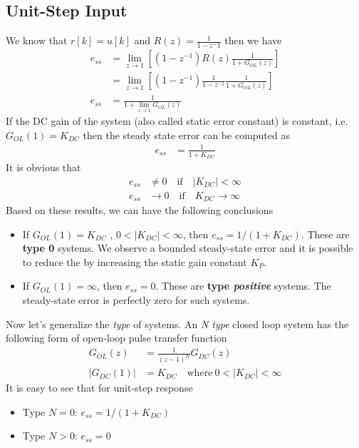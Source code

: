 \documentclass[twoside]{article}
\begin{document}
\subsection*{Unit-Step Input}

We know that $r[k] = u[k]$ and $R(z) = \frac{1}{1 - z^-1}$ then 
we have
%
%
\begin{align*}
e_{ss} &= \lim_{z \to 1} \left[ \left(1 - z^{-1} \right) R(z) \frac{1}{1
         + G_{OL} (z) } \right]
\\
&= \lim_{z \to 1} \left[ \left(1 - z^{-1} \right) \frac{1}{1-z^{-1}} \frac{1}{1
         + G_{OL} (z) } \right]
\\
e_{ss} &= \frac{1}{1 + \lim_{z \to 1} G_{OL} (z) }
\end{align*}
%
If the DC gain of the system (also called static error constant) is
constant, i.e. $G_{OL}(1) = K_{DC}$ then the steady state error can be
computed as
%
\begin{align*}
e_{ss} &= \frac{1}{1 + K_{DC}}
\end{align*}
%
It is obvious that 
%
\begin{align*}
e_{ss} &\neq 0 \quad \mathrm{if} \quad |K_{DC}| < \infty
\\
e_{ss} &\to 0 \quad \mathrm{if} \quad K_{DC} \to \infty
\end{align*}
%
Based on these results, we can have the following conclusions
%
\begin{itemize}
\item If $G_{OL} (1) = K_{DC}$ , $0 < | K_{DC} | < \infty$, then $e_{ss} =
  1/(1 + K_{DC})$. These are \textbf{type 0} systems. We observe a
  bounded steady-state error and it is possible to reduce the by increasing the static gain
constant $K_P$. 
\item  If $G_{OL} (1) = \infty$, then $e_{ss} = 0$. These are
  \textbf{type \textit{positive}} systems. The steady-state error
  is perfectly zero for such systems.
\end{itemize}

Now let's generalize the \textit{type} of systems. An \textit{N type}
closed loop system has the following form of open-loop pulse transfer 
function
%
\begin{align*}
G_{OL}(z) &= \frac{1}{(z-1)^N} G_{DC}(z) \\
| G_{DC}(1) | &= K_{DC} \quad \mathrm{where} \ 0 < | K_{DC} | < \infty
\end{align*}
% 
It is easy to see that for unit-step response
%
\begin{itemize}
\item Type $N = 0$: $e_{ss} =  1/(1 + K_{DC})$
\item Type $N > 0$: $e_{ss} = 0$
\end{itemize}
\end{document}
